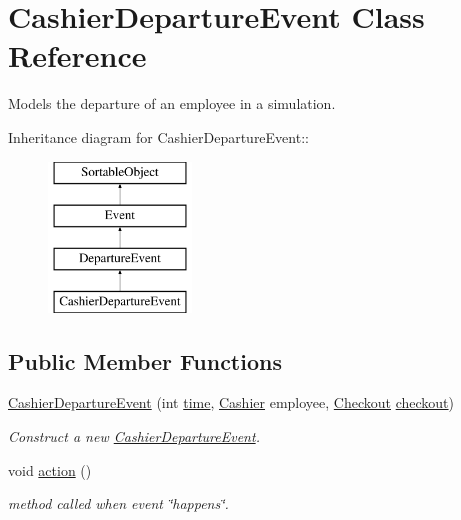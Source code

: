 \hypertarget{class_cashier_departure_event}{
\section{CashierDepartureEvent Class Reference}
\label{class_cashier_departure_event}
}
Models the departure of an employee in a simulation.  


Inheritance diagram for CashierDepartureEvent::\begin{figure}[H]
\begin{center}
\leavevmode
\includegraphics[height=4cm]{class_cashier_departure_event}
\end{center}
\end{figure}
\subsection*{Public Member Functions}
\begin{CompactItemize}
\item 
\hyperlink{class_cashier_departure_event_393f31367b81ce356ab721ebae00f63d}{CashierDepartureEvent} (int \hyperlink{class_event_d4c0fbb00c3fd993405df98bafcd52c5}{time}, \hyperlink{class_cashier}{Cashier} employee, \hyperlink{class_checkout}{Checkout} \hyperlink{class_departure_event_2fac3154bc1da1ab0a32c457872451a1}{checkout})
\begin{CompactList}\small\item\em Construct a new \hyperlink{class_cashier_departure_event}{CashierDepartureEvent}. \item\end{CompactList}\item 
void \hyperlink{class_cashier_departure_event_58a6e618df64f71ef309786ef8a9488f}{action} ()
\begin{CompactList}\small\item\em method called when event \char`\"{}happens\char`\"{}. \item\end{CompactList}\end{CompactItemize}


